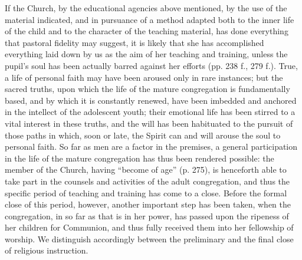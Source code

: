 If the Church, by the educational agencies above mentioned, by the use of the material indicated, and in pursuance of a method adapted both to the inner life of the child and to the character of the teaching material, has done everything that pastoral fidelity may suggest, it is likely that she has accomplished everything laid down by us as the aim of her teaching and training, unless the pupil's soul has been actually barred against her efforts (pp. 238 f., 279 f.). True, a life of personal faith may have been aroused only in rare instances; but the sacred truths, upon which the life of the mature congregation is fundamentally based, and by which it is constantly renewed, have been imbedded and anchored in the intellect of the adolescent youth; their emotional life has been stirred to a
vital interest in these truths, and the will has been habituated to the pursuit of those paths in which, soon or late, the Spirit can and will arouse the soul to personal faith. So far as men are a factor in the premises, a general participation in the life of the mature congregation has thus been rendered possible: the member of the Church, having “become of age” (p. 275), is henceforth able to take part in the counsels and activities of the adult congregation, and thus the specific period of teaching and training has come to a close. Before the formal close of this period, however, another important step has been taken, when the congregation, in so far as that is in her power, has passed upon the ripeness of her children for Communion, and thus fully received them into her fellowship of worship. We distinguish accordingly between the preliminary and the final close of religious instruction.

